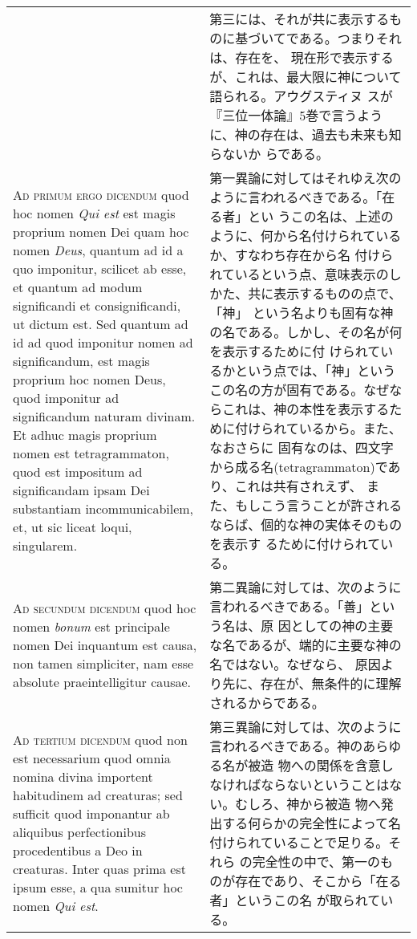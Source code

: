 \documentclass[paper=a4paper,fontsize=10pt,jafontsize=9pt,titlepage]{jlreq}
\begin{document}
\begin{longtable}{p{21em}p{21em}}
&

第三には、それが共に表示するものに基づいてである。つまりそれは、存在を、
現在形で表示するが、これは、最大限に神について語られる。アウグスティヌ
スが『三位一体論』5巻で言うように、神の存在は、過去も未来も知らないか
らである。

\\

{\scshape Ad primum ergo dicendum} quod hoc nomen {\itshape Qui est}
est magis proprium nomen Dei quam hoc nomen {\itshape Deus}, quantum
ad id a quo imponitur, scilicet ab esse, et quantum ad modum
significandi et consignificandi, ut dictum est. Sed quantum ad id ad
quod imponitur nomen ad significandum, est magis proprium hoc nomen
Deus, quod imponitur ad significandum naturam divinam. Et adhuc magis
proprium nomen est tetragrammaton, quod est impositum ad significandam
ipsam Dei substantiam incommunicabilem, et, ut sic liceat loqui,
singularem.

&

第一異論に対してはそれゆえ次のように言われるべきである。「在る者」とい
うこの名は、上述のように、何から名付けられているか、すなわち存在から名
付けられているという点、意味表示のしかた、共に表示するものの点で、「神」
という名よりも固有な神の名である。しかし、その名が何を表示するために付
けられているかという点では、「神」というこの名の方が固有である。なぜな
らこれは、神の本性を表示するために付けられているから。また、なおさらに
固有なのは、四文字から成る名(tetragrammaton)であり、これは共有されえず、
また、もしこう言うことが許されるならば、個的な神の実体そのものを表示す
るために付けられている。

\\

{\scshape Ad secundum dicendum} quod hoc nomen {\itshape bonum} est
principale nomen Dei inquantum est causa, non tamen simpliciter, nam
esse absolute praeintelligitur causae.

&

第二異論に対しては、次のように言われるべきである。「善」という名は、原
因としての神の主要な名であるが、端的に主要な神の名ではない。なぜなら、
原因より先に、存在が、無条件的に理解されるからである。

\\

{\scshape Ad tertium dicendum} quod non est necessarium quod omnia
nomina divina importent habitudinem ad creaturas; sed sufficit quod
imponantur ab aliquibus perfectionibus procedentibus a Deo in
creaturas. Inter quas prima est ipsum esse, a qua sumitur hoc nomen
{\itshape Qui est}.

&

第三異論に対しては、次のように言われるべきである。神のあらゆる名が被造
物への関係を含意しなければならないということはない。むしろ、神から被造
物へ発出する何らかの完全性によって名付けられていることで足りる。それら
の完全性の中で、第一のものが存在であり、そこから「在る者」というこの名
が取られている。

\end{longtable}
\end{document}
